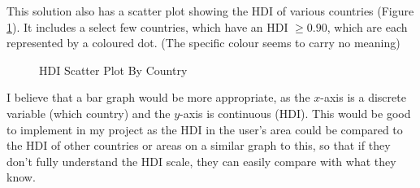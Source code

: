 \documentclass[12pt]{report}
\begin{document}
This solution also has a scatter plot showing the HDI of various countries (Figure \ref{fig:es1b}). It includes a select few countries, which have an HDI $\geq 0.90$, which are each represented by a coloured dot. (The specific colour seems to carry no meaning)
\begin{figure}[H]
\centering
{}
\caption{HDI Scatter Plot By Country}\label{fig:es1b}
\end{figure}
I believe that a bar graph would be more appropriate, as the $x$-axis is a discrete variable (which country) and the $y$-axis is continuous (HDI). This would be good to implement in my project as the HDI in the user's area could be compared to the HDI of other countries or areas on a similar graph to this, so that if they don't fully understand the HDI scale, they can easily compare with what they know.
\end{document}
